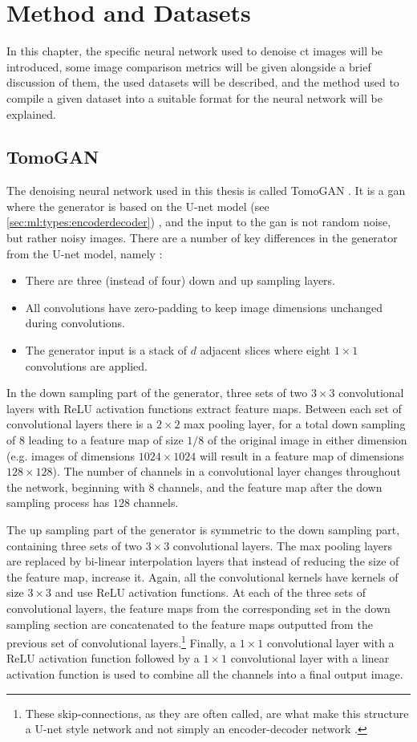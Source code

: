\chapter{Method and Datasets}
\label{sec:method}
In this chapter, the specific neural network used to denoise \gls{ct} images will be introduced, some image comparison metrics will be given alongside a brief discussion of them, the used datasets will be described, and the method used to compile a given dataset into a suitable format for the neural network will be explained. 


\section{TomoGAN}
\label{sec:method:tomogan}
The denoising neural network used in this thesis is called TomoGAN \cite{liu2020tomogan}. It is a \gls{gan} where the generator is based on the U-net model (see \cref{sec:ml:types:encoderdecoder}) \cite{unet}, and the input to the \gls{gan} is not random noise, but rather noisy images. There are a number of key differences in the generator from the U-net model, namely \cite{liu2020tomogan}:
\begin{itemize}
    \item There are three (instead of four) down and up sampling layers.
    \item All convolutions have zero-padding to keep image dimensions unchanged during convolutions.
    \item The generator input is a stack of $d$ adjacent slices where eight $1\times1$ convolutions are applied. 
\end{itemize}
In the down sampling part of the generator, three sets of two $3\times3$ convolutional layers with ReLU activation functions extract feature maps. Between each set of convolutional layers there is a $2\times2$ max pooling layer, for a total down sampling of $8$ leading to a feature map of size $1/8$ of the original image in either dimension (e.g. images of dimensions $1024\times1024$ will result in a feature map of dimensions $128\times128$). The number of channels in a convolutional layer changes throughout the network, beginning with $8$ channels, and the feature map after the down sampling process has $128$ channels. 

The up sampling part of the generator is symmetric to the down sampling part, containing three sets of two $3\times3$ convolutional layers. The max pooling layers are replaced by bi-linear interpolation layers that instead of reducing the size of the feature map, increase it. Again, all the convolutional kernels have kernels of size $3\times3$ and use ReLU activation functions. At each of the three sets of convolutional layers, the feature maps from the corresponding set in the down sampling section are concatenated to the feature maps outputted from the previous set of convolutional layers.\footnote{These skip-connections, as they are often called, are what make this structure a U-net style network and not simply an encoder-decoder network \cite{unet}. } Finally, a $1\times1$ convolutional layer with a ReLU activation function followed by a $1\times1$ convolutional layer with a linear activation function is used to combine all the channels into a final output image. 

